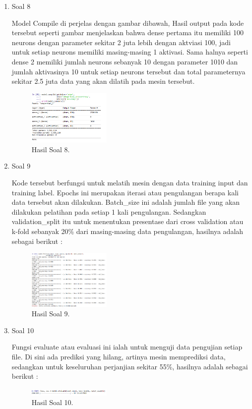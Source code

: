 \begin{enumerate}
	\item Soal 8
	\hfill\break
	
	Model Compile di perjelas dengan gambar dibawah, Hasil output pada kode tersebut seperti gambar  menjelaskan bahwa dense pertama itu memiliki 100 neurons dengan parameter sekitar 2 juta lebih dengan aktviasi 100, jadi untuk setiap neurons memiliki masing-masing 1 aktivasi. Sama halnya seperti dense 2 memiliki jumlah neurons sebanyak 10 dengan parameter 1010 dan jumlah aktivasinya 10 untuk setiap neurons tersebut dan total parameternya sekitar 2.5 juta data yang akan dilatih pada mesin tersebut.
	\begin{figure}[H]
	\centering
		\includegraphics[width=4cm]{figures/1174087/6/17.png}
		\caption{Hasil Soal 8.}
	\end{figure}

	\item Soal 9
	\hfill\break
	
	Kode tersebut berfungsi untuk melatih mesin dengan data training input dan training label. Epochs ini merupakan iterasi atau pengulangan berapa kali data tersebut akan dilakukan. Batch\_size ini adalah jumlah file yang akan dilakukan pelatihan pada setiap 1 kali pengulangan. Sedangkan validation\_split itu untuk menentukan presentase dari cross validation atau k-fold sebanyak 20\% dari masing-masing data pengulangan, hasilnya adalah sebagai berikut :
	\begin{figure}[H]
	\centering
		\includegraphics[width=4cm]{figures/1174087/6/18.png}
		\caption{Hasil Soal 9.}
	\end{figure}

	\item Soal 10
	\hfill\break
	
	Fungsi evaluate atau evaluasi ini ialah untuk menguji data pengujian setiap file. Di sini ada prediksi yang hilang, artinya mesin memprediksi data, sedangkan untuk keseluruhan perjanjian sekitar 55\%, hasilnya adalah sebagai berikut :
	\begin{figure}[H]
	\centering
		\includegraphics[width=4cm]{figures/1174087/6/19.png}
		\caption{Hasil Soal 10.}
	\end{figure}


\end{enumerate}
